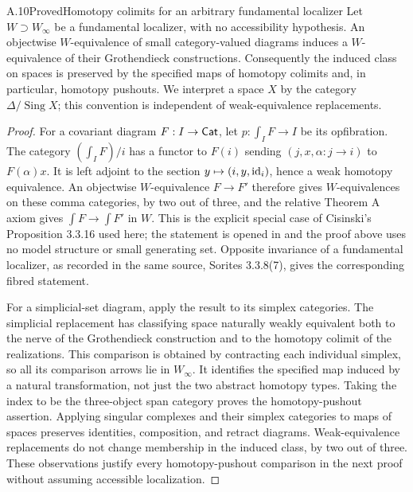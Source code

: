 \begin{claim}{A.10}{Proved}{Homotopy colimits for an arbitrary fundamental localizer}\label{A:localizer-hocolimits}
Let $W\supset W_\infty$ be a fundamental localizer, with no accessibility hypothesis. An objectwise $W$-equivalence of small category-valued diagrams induces a $W$-equivalence of their Grothendieck constructions. Consequently the induced class on spaces is preserved by the specified maps of homotopy colimits and, in particular, homotopy pushouts. We interpret a space $X$ by the category $\Delta/\operatorname{Sing}X$; this convention is independent of weak-equivalence replacements.
\end{claim}
\begin{proof}
For a covariant diagram $F:I\to\mathsf{Cat}$, let $p:\int_I F\to I$ be its opfibration. The category $(\int_I F)/i$ has a functor to $F(i)$ sending $(j,x,\alpha:j\to i)$ to $F(\alpha)x$. It is left adjoint to the section $y\mapsto(i,y,\mathrm{id}_i)$, hence a weak homotopy equivalence. An objectwise $W$-equivalence $F\to F'$ therefore gives $W$-equivalences on these comma categories, by two out of three, and the relative Theorem A axiom gives $\int F\to\int F'$ in $W$. This is the explicit special case of Cisinski's Proposition 3.3.16 used here; the statement is opened in \cite{Cisinski2006} and the proof above uses no model structure or small generating set. Opposite invariance of a fundamental localizer, as recorded in the same source, Sorites 3.3.8(7), gives the corresponding fibred statement.

For a simplicial-set diagram, apply the result to its simplex categories. The simplicial replacement has classifying space naturally weakly equivalent both to the nerve of the Grothendieck construction and to the homotopy colimit of the realizations. This comparison is obtained by contracting each individual simplex, so all its comparison arrows lie in $W_\infty$. It identifies the specified map induced by a natural transformation, not just the two abstract homotopy types. Taking the index to be the three-object span category proves the homotopy-pushout assertion. Applying singular complexes and their simplex categories to maps of spaces preserves identities, composition, and retract diagrams. Weak-equivalence replacements do not change membership in the induced class, by two out of three. These observations justify every homotopy-pushout comparison in the next proof without assuming accessible localization.
\end{proof}


